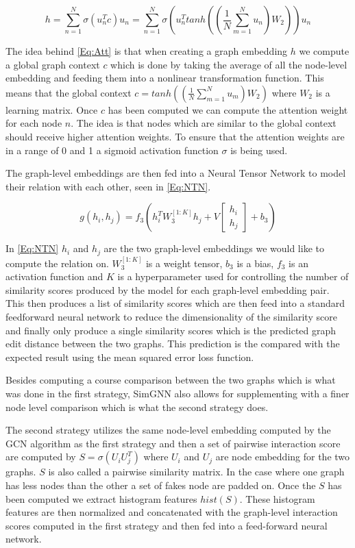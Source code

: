 \begin{equation}\label{Eq:Att}
h= \sum^N_{n=1} \sigma(u^T_nc)u_n=\sum^N_{n=1}\sigma(u^T_ntanh((\frac{1}{N}\sum_{m=1}^Nu_n)W_2))u_n
\end{equation}

The idea behind \autoref{Eq:Att} is that when creating a graph embedding $h$ we compute a global graph context $c$ which is done by taking the average of all the node-level embedding and feeding them into a nonlinear transformation function. This means that the global context $c=tanh((\frac{1}{N}\sum_{m=1}^Nu_m)W_2)$ where $W_2$ is a learning matrix. Once $c$ has been computed we can compute the attention weight for each node $n$. The idea is that nodes which are similar to the global context should receive higher attention weights. To ensure that the attention weights are in a range of 0 and 1 a sigmoid activation function $\sigma$ is being used\cite{Bai2018}.


The graph-level embeddings are then fed into a Neural Tensor Network to model their relation with each other, seen in \autoref{Eq:NTN}.


\begin{equation}\label{Eq:NTN}
g(h_i,h_j) = f_3(h_i^TW_3^{[1:K]}h_j+V\begin{bmatrix}h_i \\ h_j \end{bmatrix} + b_3)
\end{equation}

In \autoref{Eq:NTN} $h_i$ and $h_j$ are the two graph-level embeddings we would like to compute the relation on. $W_3^{[1:K]}$ is a weight tensor, $b_3$ is a bias,  $f_3$ is an activation function and $K$ is a hyperparameter used for controlling the number of similarity scores produced by the model for each graph-level embedding pair\cite{Bai2018}. This then produces a list of similarity scores which are then feed into a standard feedforward neural network to reduce the dimensionality of the similarity score and finally only produce a single similarity scores which is the predicted graph edit distance between the two graphs. This prediction is the compared with the expected result using the mean squared error loss function\cite{Bai2018}.


Besides computing a course comparison between the two graphs which is what was done in the first strategy, SimGNN also allows for supplementing with a finer node level comparison which is what the second strategy does.

The second strategy utilizes the same node-level embedding computed by the GCN algorithm as the first strategy and then a set of pairwise interaction score are computed by $S = \sigma(U_iU_j^T)$ where $U_i$ and $U_j$ are node embedding for the two graphs. $S$ is also called a pairwise similarity matrix. In the case where one graph has less nodes than the other a set of fakes node are padded on. Once the $S$ has been computed we extract histogram features $hist(S)$. These histogram features are then normalized and concatenated with the graph-level interaction scores computed in the first strategy and then fed into a feed-forward neural network\cite{Bai2018}.




